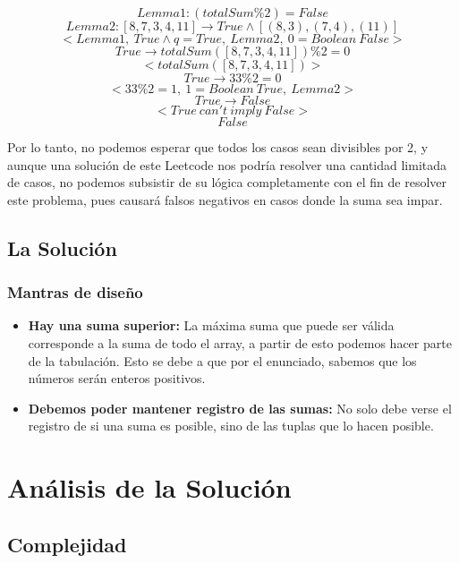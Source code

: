 \documentclass[a4paper]{article}
\begin{document}
    $$Lemma 1: (totalSum\%2) = False $$
    $$Lemma 2: [8, 7, 3, 4, 11] \rightarrow True \land [(8,3),(7,4),(11)] $$
    $$< Lemma 1, \ True \land q = True, \ Lemma 2, \ 0 = Boolean \ False >$$ 
    $$  True \rightarrow totalSum([8, 7, 3, 4, 11])\%2 = 0$$
    $$<totalSum([8, 7, 3, 4, 11])>$$ 
    $$True \rightarrow 33\%2 = 0$$
    $$<33\%2 = 1 , \ 1 = Boolean \ True, \ Lemma 2>$$ 
    $$True \rightarrow False$$
    $$<True \ can't \ imply \ False>$$
    $$False$$

Por lo tanto, no podemos esperar que todos los casos sean divisibles por 2, y aunque
una solución de este Leetcode nos podría resolver una cantidad limitada de casos, no podemos
subsistir de su lógica completamente con el fin de resolver este problema, pues causará 
falsos negativos en casos donde la suma sea impar.

\subsection{La Solución}
\subsubsection{Mantras de diseño}
\begin{itemize}
    \item \textbf{Hay una suma superior: }La máxima suma que puede ser válida corresponde
    a la suma de todo el array, a partir de esto podemos hacer parte de la tabulación.
    Esto se debe a que por el enunciado, sabemos que los números serán enteros positivos.
    \item \textbf{Debemos poder mantener registro de las sumas: } No solo debe verse el 
    registro de si una suma es posible, sino de las tuplas que lo hacen posible.
\end{itemize}



\section{Análisis de la Solución}

\subsection{Complejidad}
\end{document}

